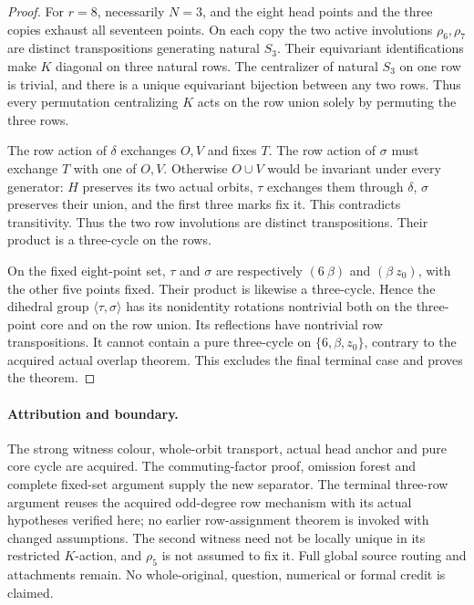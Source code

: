 \documentclass[11pt,a4paper]{article}
\newcommand{\gen}[1]{\langle#1\rangle}
\begin{document}
\begin{proof}
For $r=8$, necessarily $N=3$, and the eight head
points and the three copies exhaust all seventeen
points. On each copy the two active involutions
$\rho_6,\rho_7$ are distinct transpositions generating
natural $S_3$. Their equivariant identifications
make $K$ diagonal on three natural rows. The
centralizer of natural $S_3$ on one row is trivial,
and there is a unique equivariant bijection between
any two rows. Thus every permutation centralizing
$K$ acts on the row union solely by permuting the
three rows.

The row action of $\delta$ exchanges $O,V$ and
fixes $T$. The row action of $\sigma$ must exchange
$T$ with one of $O,V$. Otherwise $O\cup V$ would
be invariant under every generator: $H$ preserves
its two actual orbits, $\tau$ exchanges them through
$\delta$, $\sigma$ preserves their union, and the
first three marks fix it. This contradicts
transitivity. Thus the two row involutions are
distinct transpositions. Their product is a
three-cycle on the rows.

On the fixed eight-point set, $\tau$ and $\sigma$
are respectively $(6\ \beta)$ and $(\beta\ z_0)$,
with the other five points fixed. Their product
is likewise a three-cycle. Hence the dihedral
group $\gen{\tau,\sigma}$ has its nonidentity
rotations nontrivial both on the three-point
core and on the row union. Its reflections have
nontrivial row transpositions. It cannot contain
a pure three-cycle on $\{6,\beta,z_0\}$, contrary
to the acquired actual overlap theorem. This
excludes the final terminal case and proves
the theorem.
\end{proof}

\paragraph{Attribution and boundary.}
The strong witness colour, whole-orbit transport,
actual head anchor and pure core cycle are acquired.
The commuting-factor proof, omission forest and
complete fixed-set argument supply the new separator.
The terminal three-row argument reuses the acquired
odd-degree row mechanism with its actual hypotheses
verified here; no earlier row-assignment theorem
is invoked with changed assumptions. The second
witness need not be locally unique in its restricted
$K$-action, and $\rho_5$ is not assumed to fix it.
Full global source routing and attachments remain.
No whole-original, question, numerical or formal
credit is claimed.
\end{document}
